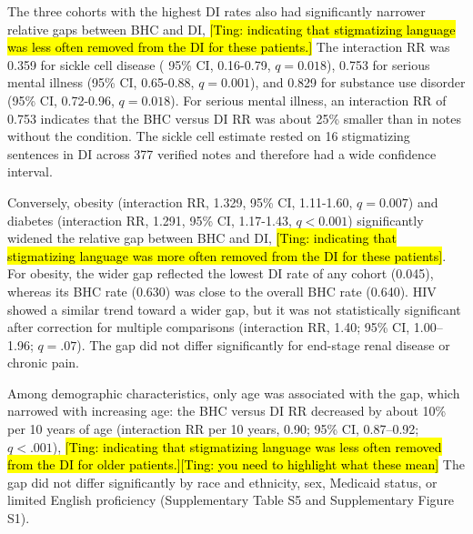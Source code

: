 \documentclass[unnumsec,webpdf,contemporary,large]{oup-authoring-template}
\newcommand{\td}[1]{\sethlcolor{pink}\hl{[Ting: #1]}}
\begin{document}
The three cohorts with the highest DI rates also had significantly narrower relative gaps between BHC and DI, \td{indicating that stigmatizing language was less often removed from the DI for these patients.} The interaction RR was 0.359 for sickle cell disease ( 95\% CI, 0.16-0.79, $q=0.018$), 0.753 for serious mental illness (95\% CI, 0.65-0.88, $q=0.001$), and 0.829 for substance use disorder (95\% CI, 0.72-0.96, $q=0.018$). For serious mental illness, an interaction RR of 0.753 indicates that the BHC versus DI RR was about 25\% smaller than in notes without the condition. The sickle cell estimate rested on 16 stigmatizing sentences in DI across 377 verified notes and therefore had a wide confidence interval.

Conversely, obesity (interaction RR, 1.329, 95\% CI, 1.11-1.60, $q=0.007$) and diabetes (interaction RR, 1.291, 95\% CI, 1.17-1.43, $q<0.001$) significantly widened the relative gap between BHC and DI, \td{indicating that stigmatizing language was more often removed from the DI for these patients}. %
For obesity, the wider gap reflected the lowest DI rate of any cohort (0.045), whereas its BHC rate (0.630) was close to the overall BHC rate (0.640). HIV showed a similar trend toward a wider gap, but it was not statistically significant after correction for multiple comparisons (interaction RR, 1.40; 95\% CI, 1.00--1.96; $q=.07$). The gap did not differ significantly for end-stage renal disease or chronic pain.

Among demographic characteristics, only age was associated with the gap, which narrowed with increasing age: the BHC versus DI RR decreased by about 10\% per 10 years of age (interaction RR per 10 years, 0.90; 95\% CI, 0.87--0.92; $q<.001$), \td{indicating that stigmatizing language was less often removed from the DI for older patients.}\td{you need to highlight what these mean} The gap did not differ significantly by race and ethnicity, sex, Medicaid status, or limited English proficiency (Supplementary Table S5 and Supplementary Figure S1).
\end{document}
